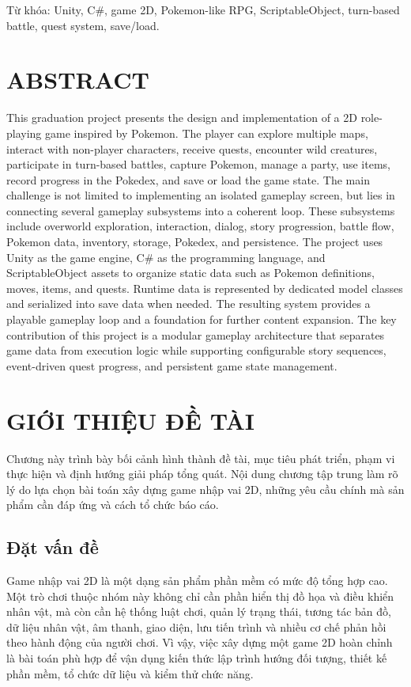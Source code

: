 Từ khóa: Unity, C\#, game 2D, Pokemon-like RPG, ScriptableObject, turn-based battle, quest system, save/load.

\chapter*{ABSTRACT}

This graduation project presents the design and implementation of a 2D role-playing game inspired by Pokemon. The player can explore multiple maps, interact with non-player characters, receive quests, encounter wild creatures, participate in turn-based battles, capture Pokemon, manage a party, use items, record progress in the Pokedex, and save or load the game state. The main challenge is not limited to implementing an isolated gameplay screen, but lies in connecting several gameplay subsystems into a coherent loop. These subsystems include overworld exploration, interaction, dialog, story progression, battle flow, Pokemon data, inventory, storage, Pokedex, and persistence. The project uses Unity as the game engine, C\# as the programming language, and ScriptableObject assets to organize static data such as Pokemon definitions, moves, items, and quests. Runtime data is represented by dedicated model classes and serialized into save data when needed. The resulting system provides a playable gameplay loop and a foundation for further content expansion. The key contribution of this project is a modular gameplay architecture that separates game data from execution logic while supporting configurable story sequences, event-driven quest progress, and persistent game state management.

\chapter{GIỚI THIỆU ĐỀ TÀI}

Chương này trình bày bối cảnh hình thành đề tài, mục tiêu phát triển, phạm vi thực hiện và định hướng giải pháp tổng quát. Nội dung chương tập trung làm rõ lý do lựa chọn bài toán xây dựng game nhập vai 2D, những yêu cầu chính mà sản phẩm cần đáp ứng và cách tổ chức báo cáo.

\section{Đặt vấn đề}

Game nhập vai 2D là một dạng sản phẩm phần mềm có mức độ tổng hợp cao. Một trò chơi thuộc nhóm này không chỉ cần phần hiển thị đồ họa và điều khiển nhân vật, mà còn cần hệ thống luật chơi, quản lý trạng thái, tương tác bản đồ, dữ liệu nhân vật, âm thanh, giao diện, lưu tiến trình và nhiều cơ chế phản hồi theo hành động của người chơi. Vì vậy, việc xây dựng một game 2D hoàn chỉnh là bài toán phù hợp để vận dụng kiến thức lập trình hướng đối tượng, thiết kế phần mềm, tổ chức dữ liệu và kiểm thử chức năng.

